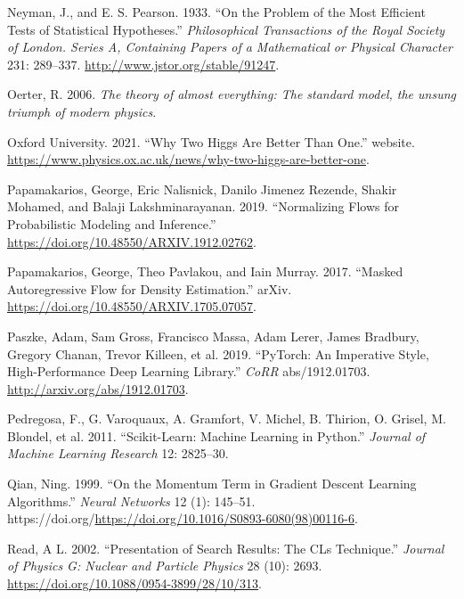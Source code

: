 \documentclass[
  11pt,
  numbers=noendperiod]{book}
\newlength{\cslhangindent}
\newlength{\cslentryspacingunit} %
\newenvironment{CSLReferences}[2] %
 {%
  \setlength{\parindent}{0pt}
  \ifodd #1
  \let\oldpar\par
  \def\par{\hangindent=\cslhangindent\oldpar}
  \fi
  \setlength{\parskip}{#2\cslentryspacingunit}
 }%
 {}
\begin{document}
\begin{CSLReferences}{1}{0}
\leavevmode{}%
Neyman, J., and E. S. Pearson. 1933. {``On the Problem of the Most
Efficient Tests of Statistical Hypotheses.''} \emph{Philosophical
Transactions of the Royal Society of London. Series A, Containing Papers
of a Mathematical or Physical Character} 231: 289--337.
\url{http://www.jstor.org/stable/91247}.

\leavevmode{}%
Oerter, R. 2006. \emph{{The theory of almost everything: The standard
model, the unsung triumph of modern physics}}.

\leavevmode{}%
Oxford University. 2021. {``Why Two Higgs Are Better Than One.''}
website.
\url{https://www.physics.ox.ac.uk/news/why-two-higgs-are-better-one}.

\leavevmode{}%
Papamakarios, George, Eric Nalisnick, Danilo Jimenez Rezende, Shakir
Mohamed, and Balaji Lakshminarayanan. 2019. {``Normalizing Flows for
Probabilistic Modeling and Inference.''}
\url{https://doi.org/10.48550/ARXIV.1912.02762}.

\leavevmode{}%
Papamakarios, George, Theo Pavlakou, and Iain Murray. 2017. {``Masked
Autoregressive Flow for Density Estimation.''} arXiv.
\url{https://doi.org/10.48550/ARXIV.1705.07057}.

\leavevmode{}%
Paszke, Adam, Sam Gross, Francisco Massa, Adam Lerer, James Bradbury,
Gregory Chanan, Trevor Killeen, et al. 2019. {``PyTorch: An Imperative
Style, High-Performance Deep Learning Library.''} \emph{CoRR}
abs/1912.01703. \url{http://arxiv.org/abs/1912.01703}.

\leavevmode{}%
Pedregosa, F., G. Varoquaux, A. Gramfort, V. Michel, B. Thirion, O.
Grisel, M. Blondel, et al. 2011. {``Scikit-Learn: Machine Learning in
{P}ython.''} \emph{Journal of Machine Learning Research} 12: 2825--30.

\leavevmode{}%
Qian, Ning. 1999. {``On the Momentum Term in Gradient Descent Learning
Algorithms.''} \emph{Neural Networks} 12 (1): 145--51.
https://doi.org/\url{https://doi.org/10.1016/S0893-6080(98)00116-6}.

\leavevmode{}%
Read, A L. 2002. {``Presentation of Search Results: The CLs
Technique.''} \emph{Journal of Physics G: Nuclear and Particle Physics}
28 (10): 2693. \url{https://doi.org/10.1088/0954-3899/28/10/313}.


\end{CSLReferences}
\end{document}
